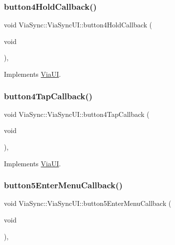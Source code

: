 \subsubsection{\texorpdfstring{button4\+Hold\+Callback()}{button4HoldCallback()}}
{\footnotesize\ttfamily void Via\+Sync\+::\+Via\+Sync\+U\+I\+::button4\+Hold\+Callback (\begin{DoxyParamCaption}\item[{void}]{ }\end{DoxyParamCaption})\hspace{0.3cm}{\ttfamily [override]}, {\ttfamily [virtual]}}



Implements \mbox{\hyperlink{class_via_u_i_a11919091b39319fe4d1b3a3f3c7104c5}{Via\+UI}}.

\mbox{\label{class_via_sync_1_1_via_sync_u_i_a00ba5badfeedc792a05f3e3c0ac19d73}} 
\subsubsection{\texorpdfstring{button4\+Tap\+Callback()}{button4TapCallback()}}
{\footnotesize\ttfamily void Via\+Sync\+::\+Via\+Sync\+U\+I\+::button4\+Tap\+Callback (\begin{DoxyParamCaption}\item[{void}]{ }\end{DoxyParamCaption})\hspace{0.3cm}{\ttfamily [override]}, {\ttfamily [virtual]}}



Implements \mbox{\hyperlink{class_via_u_i_a4925f089aa720ca88d84246f434112e9}{Via\+UI}}.

\mbox{\label{class_via_sync_1_1_via_sync_u_i_ad02cd6e9495afcd256a3b3475809bf5b}} 
\subsubsection{\texorpdfstring{button5\+Enter\+Menu\+Callback()}{button5EnterMenuCallback()}}
{\footnotesize\ttfamily void Via\+Sync\+::\+Via\+Sync\+U\+I\+::button5\+Enter\+Menu\+Callback (\begin{DoxyParamCaption}\item[{void}]{ }\end{DoxyParamCaption})\hspace{0.3cm}{\ttfamily [override]}, {\ttfamily [virtual]}}



